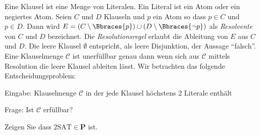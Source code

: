 
\begin{exercise}

Eine Klausel ist eine Menge von Literalen.
Ein Literal ist ein Atom oder ein negiertes Atom.
Seien $C$ und $D$ Klauseln und $p$ ein Atom so dass $p \in C$ und $p \in D$.
Dann wird $E = (C \setminus \Bbraces{p}) \cup (D \setminus \Bbraces{\neg p})$ als \textit{Resolvente} von $C$ und $D$ bezeichnet.
Die \textit{Resolutionsregel} erlaubt die Ableitung von $E$ aus $C$ und $D$.
Die leere Klausel $\emptyset$ entspricht, als leere Disjunktion, der Aussage \enquote{falsch}.
Eine Klauselmenge $\mathcal C$ ist unerfüllbar genau dann wenn sich aus $\mathcal C$ mittels Resolution die leere Klausel ableiten lässt.
Wir betrachten das folgende Entscheidungsproblem:

\begin{center}
    \begin{hetzlbox}[title = 2SAT]
        
        Eingabe:
        Klauselmenge $\mathcal C$ in der jede Klausel höchstens $2$ Literale enthält
    
        Frage:
        Ist $\mathcal C$ erfüllbar?
    
    \end{hetzlbox}   
\end{center}

Zeigen Sie dass $\mathrm{2SAT} \in \mathbf P$ ist.

\end{exercise}


\begin{solution}

\phantom{}

\end{solution}

